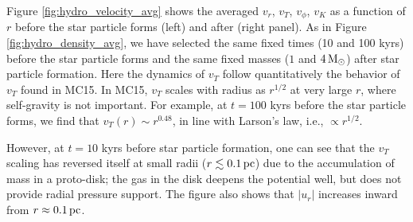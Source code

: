 \documentclass[../dissertation.tex]{subfiles}
\begin{document}
% 
\begin{figure*}[htb]%
\caption[Hydro Sink Averaged run of Velocity]{$v_r$, $v_T$, $v_{\phi}$ and $v_K$ as a function of $r$ at 10,000 
(thin lines) and 100,000 (thick lines) years before the star particle forms 
(left plot) and when the star reaches 1 and 4 $M_{\odot}$ (right plot).  
The averages are over the same regions as those used in producing 
Figure \ref{fig:hydro_density_avg}. The infall $|u_r|$ and random $v_T$ velocities show 
the behavior predicted by the theory of adiabatic turbulent heating for times 
later than $-10,000$ years: 
at large radii, where $|u_r|$ is small, $v_T>|u_r|$ and $v_T$ decreases 
inward, but more slowly than in non-collapsing regions; $p\approx0.2$ 
rather than $p=0.5$. Inside $r_*$, 
where $|u_r|>v_T$ (or $|H|>v_T$ in the notation of 
\citet{2012ApJ...750L..31R}) $v_T$ {\em increases} towards $|u_r|$ 
as $r$ decreases, with both increasing inward. \label{fig:hydro_velocity_avg}}
\end{figure*}
%

Figure \ref{fig:hydro_velocity_avg} shows the averaged $v_r$, $v_T$,  
$v_{\phi}$, $v_K$ as a function of $r$ before the star particle forms 
(left) and after (right panel).  As in Figure \ref{fig:hydro_density_avg}, 
we have selected the same fixed times (10 and 100 kyrs) before the star 
particle forms and the same fixed masses ($1$ and $4\,{\rm M}_{\odot}$) 
after star particle formation.  Here the dynamics of $v_T$ follow 
quantitatively the behavior of $v_T$ found in MC15. In MC15, $v_T$ 
scales with radius as $r^{1/2}$ at very large $r$, where self-gravity 
is not important. For example, at $t=100$ kyrs before 
the star particle forms, we find that $v_T(r)\sim r^{0.48}$, in line with
Larson's law, i.e., $\propto r^{1/2}$. 


However, at $t=10 $ kyrs before star particle formation, one can see
that the $v_T$ scaling has reversed itself at small 
radii ($r\lesssim0.1\,\rm pc$) due to the accumulation of mass in a 
proto-disk; the gas in the disk deepens the potential well, but does 
not provide radial pressure support. The figure also shows that $|u_r|$ 
increases inward from $r\approx0.1\,\rm pc$.
\end{document}
